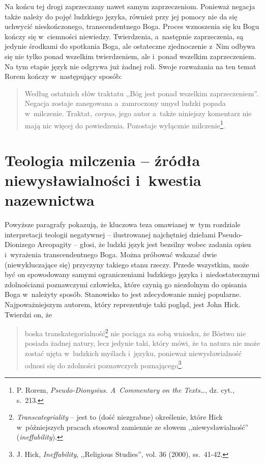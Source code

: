 Na końcu tej drogi zaprzeczamy nawet samym zaprzeczeniom. Ponieważ negacja także należy do pojęć ludzkiego języka, również przy jej pomocy nie da się uchwycić nieskończonego, transcendentnego Boga. Proces wznoszenia się ku Bogu kończy się w~ciemności niewiedzy. Twierdzenia, a~następnie zaprzeczenia, są jedynie środkami do spotkania Boga, ale ostateczne zjednoczenie z~Nim odbywa się nie tylko ponad wszelkim twierdzeniem, ale i~ponad wszelkim zaprzeczeniem. Na tym etapie język nie odgrywa już żadnej roli. Swoje rozważania na ten temat Rorem kończy w~następujący sposób:

\begin{quote}
Według ostatnich słów traktatu ,,Bóg jest ponad wszelkim zaprzeczeniem''. Negacja zostaje zanegowana a~zamroczony umysł ludzki popada w~milczenie. Traktat, \textit{corpus}, jego autor a~także niniejszy komentarz nie mają nic więcej do powiedzenia. Pozostaje wyłącznie milczenie\footnote{P. Rorem, \textit{Pseudo-Dionysius. A~Commentary on the Texts}\ldots, dz. cyt., s.~213.}.
\end{quote}


\section{Teologia milczenia -- źródła niewysławialności i~kwestia nazewnictwa}\label{sil-int-nazw}

Powyższe paragrafy pokazują, że kluczowa teza omawianej w~tym rozdziale interpretacji teologii negatywnej -- ilustrowanej najchętniej dziełami Pseudo-Dionizego Areopagity -- głosi, że ludzki język jest bezsilny wobec zadania opisu i~wyrażenia transcendentnego Boga. Można próbować wskazać dwie (niewykluczające się) przyczyny takiego stanu rzeczy. Przede wszystkim, może być on spowodowany samymi ograniczeniami ludzkiego języka i~niedostatecznymi zdolnościami poznawczymi człowieka, które czynią go niezdolnym do opisania Boga w~należyty sposób. Stanowisko to jest zdecydowanie mniej popularne. Najpoważniejszym autorem, który reprezentuje taki pogląd, jest John Hick. Twierdzi on, że

\begin{quote}
boska transkategorialność\footnote{\textit{Transcategriality} -- jest to (dość niezgrabne) określenie, które Hick w~późniejszych pracach stosował zamiennie ze słowem ,,niewysławialność'' (\textit{ineffability}).} nie pociąga za sobą wniosku, że Bóstwo nie posiada żadnej natury, lecz jedynie taki, który mówi, że ta natura nie może zostać ujęta w~ludzkich myślach i~języku, ponieważ niewysławialność odnosi się do zdolności poznawczych poznającego\footnote{J. Hick, \textit{Ineffability}, ,,Religious Studies'', vol. 36 (2000), ss.~41-42.}.
\end{quote}

